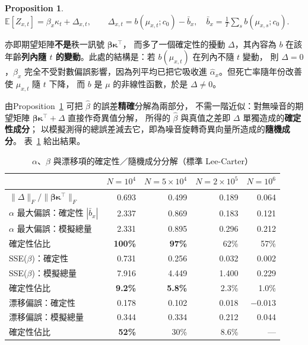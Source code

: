 \documentclass[UTF8, fontset=macnew, a4paper, 12pt]{ctexart}
\newtheorem{prop}{Proposition}
\newcommand{\Ex}{\mathbb{E}}
\begin{document}
\begin{prop}\label{prop:beta}
$\displaystyle \Ex[Z_{x,t}]=\beta_x\kappa_t+\Delta_{x,t},\qquad
\Delta_{x,t}=b(\mu_{x,t};c_0)-\bar b_x,\quad
\bar b_x=\frac1T\sum_s b(\mu_{x,s};c_0).$
\end{prop}

亦即期望矩陣\textbf{不是}秩一訊號 $\boldsymbol\beta\boldsymbol\kappa^{\top}$，
而多了一個確定性的擾動 $\Delta$，其內容為 $b$ 在該年齡\textbf{列內隨 $t$
的變動}。此處的結構是：若 $b(\mu_{x,t})$ 在列內不隨 $t$ 變動，
則 $\Delta=0$，$\beta_x$ 完全不受對數偏誤影響，因為列平均已把它吸收進
$\hat\alpha_x$。但死亡率隨年份改善使 $\mu_{x,t}$ 隨 $t$ 下降，
而 $b$ 是 $\mu$ 的非線性函數，於是 $\Delta\ne0$。

由Proposition~\ref{prop:beta} 可把 $\hat\beta$ 的誤差\textbf{精確}分解為兩部分，
不需一階近似：對無噪音的期望矩陣
$\boldsymbol\beta\boldsymbol\kappa^{\top}+\Delta$ 直接作奇異值分解，
所得的 $\hat\beta$ 與真值之差即 $\Delta$ 單獨造成的\textbf{確定性成分}；
以模擬測得的總誤差減去它，即為噪音旋轉奇異向量所造成的\textbf{隨機成分}。
表~\ref{tab:betadec} 給出結果。

\begin{table}[H]
\centering
\caption{$\alpha$、$\beta$ 與漂移項的確定性／隨機成分分解（標準 Lee-Carter）}
\small
\begin{tabular}{lrrrr}
\toprule
 & $N=10^4$ & $N=5\times10^4$ & $N=2\times10^5$ & $N=10^6$\\
\midrule
$\|\Delta\|_F/\|\boldsymbol\beta\boldsymbol\kappa^{\top}\|_F$
 & 0.693 & 0.499 & 0.189 & 0.064\\
\midrule
$\alpha$ 最大偏誤：確定性 $|\bar b_x|$ & 2.337 & 0.869 & 0.183 & 0.121\\
$\alpha$ 最大偏誤：模擬總量 & 2.331 & 0.895 & 0.296 & 0.212\\
\quad 確定性佔比 & \textbf{100\%} & \textbf{97\%} & 62\% & 57\%\\
\midrule
SSE($\beta$)：確定性 & 0.731 & 0.256 & 0.032 & 0.002\\
SSE($\beta$)：模擬總量 & 7.916 & 4.449 & 1.400 & 0.229\\
\quad 確定性佔比 & \textbf{9.2\%} & \textbf{5.8\%} & 2.3\% & 1.0\%\\
\midrule
漂移偏誤：確定性 & 0.178 & 0.102 & 0.018 & $-0.013$\\
漂移偏誤：模擬總量 & 0.344 & 0.334 & 0.212 & 0.044\\
\quad 確定性佔比 & \textbf{52\%} & 30\% & 8.6\% & ---\\
\bottomrule
\end{tabular}
\label{tab:betadec}
\end{table}
\end{document}
